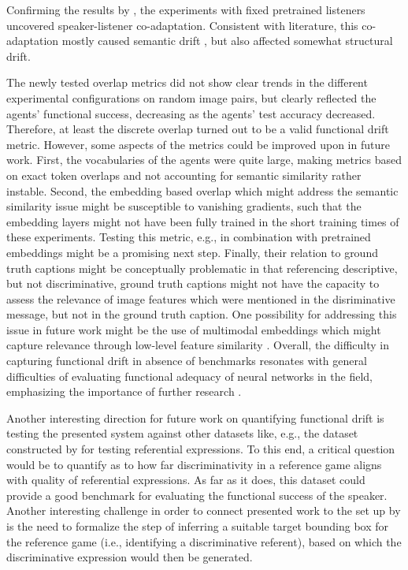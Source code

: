 Confirming the results by \cite{lazaridou2020multi}, the experiments with fixed pretrained listeners uncovered speaker-listener co-adaptation. Consistent with literature, this co-adaptation mostly caused semantic drift \parencite[cf.][]{lee2019countering}, but also affected somewhat structural drift. 

The newly tested overlap metrics did not show clear trends in the different experimental configurations on random image pairs, but clearly reflected the agents' functional success, decreasing as the agents' test accuracy decreased. Therefore, at least the discrete overlap turned out to be a valid functional drift metric. However, some aspects of the metrics could be improved upon in future work. First, the vocabularies of the agents were quite large, making metrics based on exact token overlaps and not accounting for semantic similarity rather instable. Second, the embedding based overlap which might address the semantic similarity issue might be susceptible to vanishing gradients, such that the embedding layers might not have been fully trained in the short training times of these experiments. Testing this metric, e.g., in combination with pretrained embeddings might be a promising next step. Finally, their relation to ground truth captions might be conceptually problematic in that referencing descriptive, but not discriminative, ground truth captions might not have the capacity to assess the relevance of image features which were mentioned in the disriminative message, but not in the ground truth caption. One possibility for addressing this issue in future work might be the use of multimodal embeddings which might capture relevance through low-level feature similarity \parencite[cf.][]{bruni2014multimodal}. Overall, the difficulty in capturing functional drift in absence of benchmarks resonates with general difficulties of evaluating functional adequacy of neural networks in the field, emphasizing the importance of further research \parencite[as noted, e.g., by][]{kreiss2022context, mccoy2019right}.

Another interesting direction for future work on quantifying functional drift is testing the presented system against other datasets like, e.g., the dataset constructed by \cite{mao2016generation} for testing referential expressions. To this end, a critical question would be to quantify as to how far discriminativity in a reference game aligns with quality of referential expressions. As far as it does, this dataset could provide a good benchmark for evaluating the functional success of the speaker. Another interesting challenge in order to connect presented work to the set up by \cite{mao2016generation} is the need to formalize the step of inferring a suitable target bounding box for the reference game (i.e., identifying a discriminative referent), based on which the discriminative expression would then be generated. 


